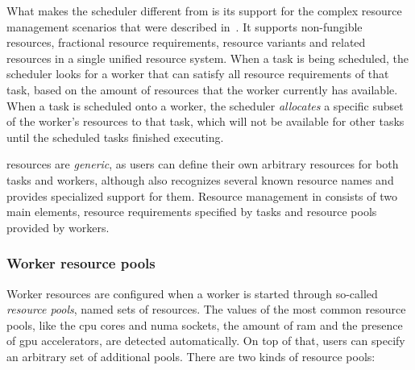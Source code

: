 What makes the scheduler different from \rsds{} is its support for the complex
resource management scenarios that were described in~. It supports
non-fungible resources, fractional resource requirements, resource variants and related resources
in a single unified resource system. When a task is being scheduled, the scheduler looks for a
worker that can satisfy all resource requirements of that task, based on the amount of resources
that the worker currently has available. When a task is scheduled onto a worker, the scheduler
\emph{allocates} a specific subset of the worker's resources to that task, which will not be
available for other tasks until the scheduled tasks finished executing.

\hyperqueue{} resources are \emph{generic}, as users can define their own
arbitrary resources for both tasks and workers, although \hq{} also recognizes
several known resource names and provides specialized support for them. Resource management in
\hyperqueue{} consists of two main elements, resource requirements specified by tasks and
resource pools provided by workers.

\subsubsection*{Worker resource pools}
Worker resources are configured when a worker is started through so-called \emph{resource pools},
named sets of resources. The values of the most common resource pools, like the
\gls{cpu} cores and \gls{numa} sockets, the amount of
\gls{ram} and the presence of \gls{gpu} accelerators, are detected
automatically. On top of that, users can specify an arbitrary set of additional pools. There are
two kinds of resource pools:

